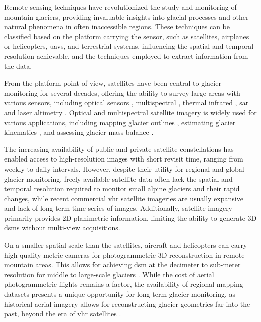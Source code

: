 Remote sensing techniques have revolutionized the study and monitoring of mountain glaciers, providing invaluable insights into glacial processes and other natural phenomena in often inaccessible regions. 
These techniques can be classified based on the platform carrying the sensor, such as satellites, airplanes or helicopters, \acp{uav}, and terrestrial systems, influencing the spatial and temporal resolution achievable, and the techniques employed to extract information from the data.

From the platform point of view, satellites have been central to glacier monitoring for several decades, offering the ability to survey large areas with various sensors, including optical sensors \cite{Scherler2008, Dehecq2015, Winsvold2016, Rabatel2017}, multispectral \cite{Hall1995, Paul2004, Kargel2005}, thermal infrared \cite{Mihalcea2008, Shukla2010, Bhambri2011}, \ac{sar} \citep{Fang2016, Winsvold2018, Strozzi2020} and laser altimetry \cite{Moholdt2010, Neckel2014}. 
Optical and multispectral satellite imagery is widely used for various applications, including mapping glacier outlines \cite{Paul_2002, Winsvold2016}, estimating glacier kinematics \cite{Scherler2008, Dehecq2015}, and assessing glacier mass balance \cite{Bamber2007, Berthier2016, Rabatel2017, Berthier2023}.

The increasing availability of public and private satellite constellations has enabled access to high-resolution images with short revisit time, ranging from weekly to daily intervals. 
However, despite their utility for regional and global glacier monitoring, freely available satellite data often lack the spatial and temporal resolution required to monitor small alpine glaciers and their rapid changes, while recent commercial \ac{vhr} satellite imageries are usually expansive and lack of long-term time series of images.
Additionally, satellite imagery primarily provides 2D planimetric information, limiting the ability to generate 3D \acp{dsm} without multi-view acquisitions.

On a smaller spatial scale than the satellites, aircraft and helicopters can carry high-quality metric cameras for photogrammetric 3D reconstruction in remote mountain areas.
This allows for achieving \ac{dsm} at the decimeter to sub-meter resolution for middle to large-scale glaciers \cite{poli2020use}. 
While the cost of aerial photogrammetric flights remains a factor, the availability of regional mapping datasets presents a unique opportunity for long-term glacier monitoring, as historical aerial imagery allows for reconstructing glacier geometries far into the past, beyond the era of \ac{vhr} satellites \citep{Degaetani2021}.

